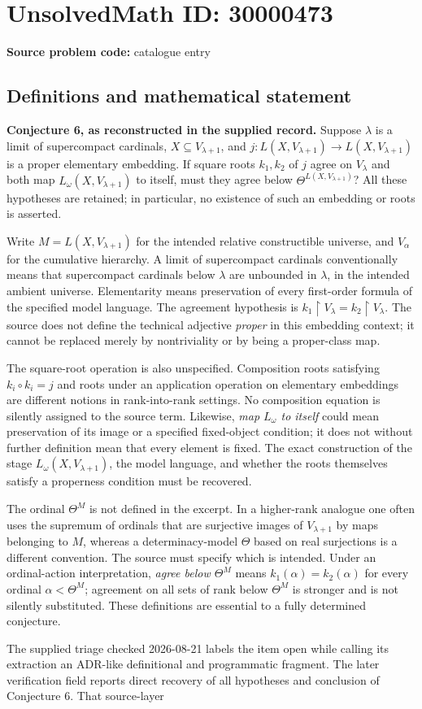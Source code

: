 \documentclass[11pt]{article}
\begin{document}
\section*{UnsolvedMath ID: 30000473}
\textbf{Source problem code:} catalogue entry
\subsection{Definitions and mathematical statement}
\textbf{Conjecture 6, as reconstructed in the supplied record.} Suppose \(\lambda\) is a limit of supercompact cardinals, \(X\subseteq V_{\lambda+1}\), and \(j:L(X,V_{\lambda+1})\to L(X,V_{\lambda+1})\) is a proper elementary embedding. If square roots \(k_1,k_2\) of \(j\) agree on \(V_\lambda\) and both map \(L_\omega(X,V_{\lambda+1})\) to itself, must they agree below \(\Theta^{L(X,V_{\lambda+1})}\)? All these hypotheses are retained; in particular, no existence of such an embedding or roots is asserted.\par Write \(M=L(X,V_{\lambda+1})\) for the intended relative constructible universe, and \(V_\alpha\) for the cumulative hierarchy. A limit of supercompact cardinals conventionally means that supercompact cardinals below \(\lambda\) are unbounded in \(\lambda\), in the intended ambient universe. Elementarity means preservation of every first-order formula of the specified model language. The agreement hypothesis is \(k_1\upharpoonright V_\lambda=k_2\upharpoonright V_\lambda\). The source does not define the technical adjective \emph{proper} in this embedding context; it cannot be replaced merely by nontriviality or by being a proper-class map.\par The square-root operation is also unspecified. Composition roots satisfying \(k_i\circ k_i=j\) and roots under an application operation on elementary embeddings are different notions in rank-into-rank settings. No composition equation is silently assigned to the source term. Likewise, \emph{map \(L_\omega\) to itself} could mean preservation of its image or a specified fixed-object condition; it does not without further definition mean that every element is fixed. The exact construction of the stage \(L_\omega(X,V_{\lambda+1})\), the model language, and whether the roots themselves satisfy a properness condition must be recovered.\par The ordinal \(\Theta^M\) is not defined in the excerpt. In a higher-rank analogue one often uses the supremum of ordinals that are surjective images of \(V_{\lambda+1}\) by maps belonging to \(M\), whereas a determinacy-model \(\Theta\) based on real surjections is a different convention. The source must specify which is intended. Under an ordinal-action interpretation, \emph{agree below \(\Theta^M\)} means \(k_1(\alpha)=k_2(\alpha)\) for every ordinal \(\alpha<\Theta^M\); agreement on all sets of rank below \(\Theta^M\) is stronger and is not silently substituted. These definitions are essential to a fully determined conjecture.\par The supplied triage checked 2026-08-21 labels the item open while calling its extraction an ADR-like definitional and programmatic fragment. The later verification field reports direct recovery of all hypotheses and conclusion of Conjecture 6. That source-layer 
\end{document}
